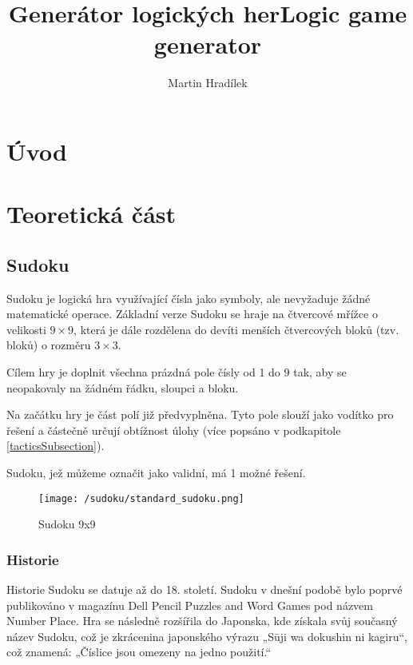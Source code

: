 \documentclass[
  master,
  program=ainfvs,
  biblatex,
  figures=true,
  tables=false,
  sourcecodes,
  glossaries,
  index
]{kidiplom}
\title{Generátor logických her}
\title[english]{Logic game generator}
\author{Martin Hradílek}
\begin{document}
\maketitle

\section{Úvod}

\section{Teoretická část}

\subsection{Sudoku}

Sudoku je logická hra využívající čísla jako symboly, ale nevyžaduje žádné matematické operace. Základní verze Sudoku se hraje na čtvercové mřížce o velikosti $9 \times 9$, která je dále rozdělena do devíti menších čtvercových bloků (tzv. bloků) o rozměru $3 \times 3$.

Cílem hry je doplnit všechna prázdná pole čísly od 1 do 9 tak, aby se neopakovaly na žádném řádku, sloupci a bloku.
 
Na začátku hry je část polí již předvyplněna. Tyto pole slouží jako vodítko pro řešení a částečně určují obtížnost úlohy (více popsáno v podkapitole \ref{tacticsSubsection}).

Sudoku, jež můžeme označit jako validní, má 1 možné řešení. 
 

\begin{figure}[!htb]
	\centering
	\texttt{[image: /sudoku/standard\_sudoku.png]}
	\caption[Sudoku 9x9]{Sudoku 9x9~\cite{CrossA2025}}
	\label{sudoku_9}
\end{figure}


\subsubsection{Historie}

Historie Sudoku se datuje až do 18. století. Sudoku v dnešní podobě bylo poprvé publikováno v magazínu Dell Pencil Puzzles and Word Games pod názvem Number Place. Hra se následně rozšířila do Japonska, kde získala svůj současný název Sudoku, což je zkrácenina japonského výrazu „Sūji wa dokushin ni kagiru“, což znamená: „Číslice jsou omezeny na jedno použití.“ \cite{Sudoku.com2025}
\end{document}
